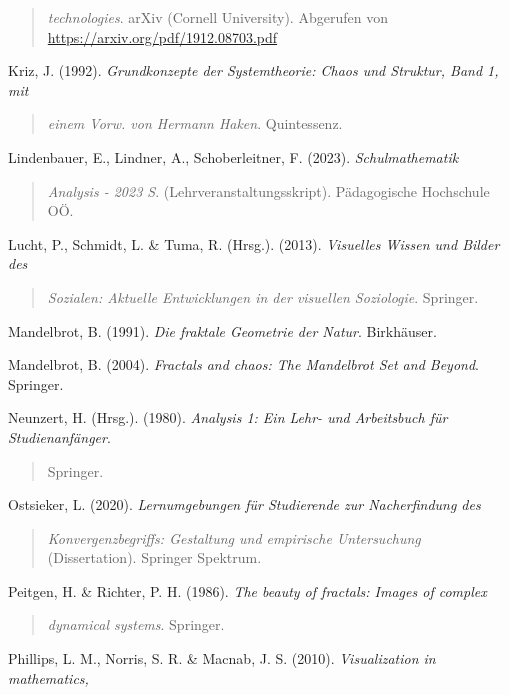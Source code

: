 \documentclass[a4paper, 12pt]{book}
\begin{document}
\begin{quote}
\emph{technologies}. arXiv (Cornell University). Abgerufen von
\url{https://arxiv.org/pdf/1912.08703.pdf}
\end{quote}

Kriz, J. (1992). \emph{Grundkonzepte der Systemtheorie: Chaos und
Struktur, Band 1, mit}

\begin{quote}
\emph{einem Vorw. von Hermann Haken}. Quintessenz.
\end{quote}

Lindenbauer, E., Lindner, A., Schoberleitner, F. (2023).
\emph{Schulmathematik}

\begin{quote}
\emph{Analysis - 2023 S}. (Lehrveranstaltungsskript). Pädagogische
Hochschule OÖ.
\end{quote}

Lucht, P., Schmidt, L. \& Tuma, R. (Hrsg.). (2013). \emph{Visuelles
Wissen und Bilder des}

\begin{quote}
\emph{Sozialen: Aktuelle Entwicklungen in der visuellen Soziologie}.
Springer.
\end{quote}

Mandelbrot, B. (1991). \emph{Die fraktale Geometrie der Natur}.
Birkhäuser.

Mandelbrot, B. (2004). \emph{Fractals and chaos: The Mandelbrot Set and
Beyond}. Springer.

Neunzert, H. (Hrsg.). (1980). \emph{Analysis 1: Ein Lehr- und
Arbeitsbuch für Studienanfänger}.

\begin{quote}
Springer.
\end{quote}

Ostsieker, L. (2020). \emph{Lernumgebungen für Studierende zur
Nacherfindung des}

\begin{quote}
\emph{Konvergenzbegriffs: Gestaltung und empirische Untersuchung}
(Dissertation). Springer Spektrum.
\end{quote}

Peitgen, H. \& Richter, P. H. (1986). \emph{The beauty of fractals:
Images of complex}

\begin{quote}
\emph{dynamical systems}. Springer.
\end{quote}

Phillips, L. M., Norris, S. R. \& Macnab, J. S. (2010).
\emph{Visualization in mathematics,}
\end{document}

